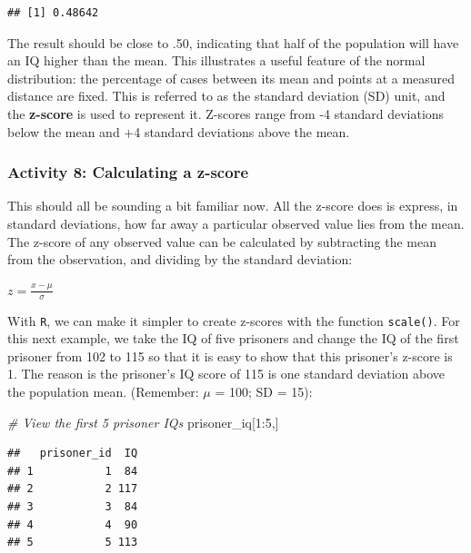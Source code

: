 \documentclass[
]{book}
\newenvironment{Shaded}{\begin{snugshade}}{\end{snugshade}}
\newcommand{\CommentTok}[1]{\textcolor[rgb]{0.56,0.35,0.01}{\textit{#1}}}
\newcommand{\DecValTok}[1]{\textcolor[rgb]{0.00,0.00,0.81}{#1}}
\newcommand{\NormalTok}[1]{#1}
\newcommand{\SpecialCharTok}[1]{\textcolor[rgb]{0.00,0.00,0.00}{#1}}
\begin{document}
\begin{verbatim}
## [1] 0.48642
\end{verbatim}

The result should be close to .50, indicating that half of the population will have an IQ higher than the mean. This illustrates a useful feature of the normal distribution: the percentage of cases between its mean and points at a measured distance are fixed. This is referred to as the standard deviation (SD) unit, and the \textbf{z-score} is used to represent it. Z-scores range from -4 standard deviations below the mean and +4 standard deviations above the mean.

\hypertarget{activity-8-calculating-a-z-score}{%
\subsubsection{Activity 8: Calculating a z-score}\label{activity-8-calculating-a-z-score}}

This should all be sounding a bit familiar now. All the z-score does is express, in standard deviations, how far away a particular observed value lies from the mean. The z-score of any observed value can be calculated by subtracting the mean from the observation, and dividing by the standard deviation:

\(z = \frac{x - \mu}{\sigma}\)

With \texttt{R}, we can make it simpler to create z-scores with the function \texttt{scale()}. For this next example, we take the IQ of five prisoners and change the IQ of the first prisoner from 102 to 115 so that it is easy to show that this prisoner's z-score is 1. The reason is the prisoner's IQ score of 115 is one standard deviation above the population mean. (Remember: \(\mu\) = 100; SD = 15):

\begin{Shaded}
\begin{Highlighting}[]
\CommentTok{\# View the first 5 prisoner IQs}
\NormalTok{prisoner\_iq[}\DecValTok{1}\SpecialCharTok{:}\DecValTok{5}\NormalTok{,] }
\end{Highlighting}
\end{Shaded}

\begin{verbatim}
##   prisoner_id  IQ
## 1           1  84
## 2           2 117
## 3           3  84
## 4           4  90
## 5           5 113
\end{verbatim}
\end{document}
